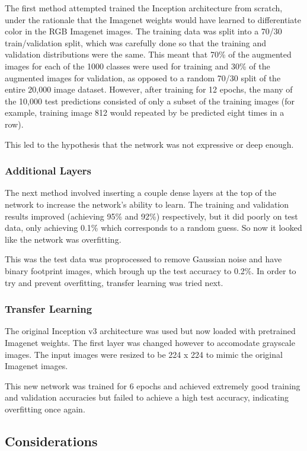 \documentclass{article}
\begin{document}
The first method attempted trained the Inception architecture from scratch, under the rationale that the Imagenet weights would have learned to differentiate color in the RGB Imagenet images. The training data was split into a 70/30 train/validation split, which was carefully done so that the training and validation distributions were the same. This meant that 70\% of the augmented images for each of the 1000 classes were used for training and 30\% of the augmented images for validation, as opposed to a random 70/30 split of the entire 20,000 image dataset. However, after training for 12 epochs, the many of the 10,000 test predictions consisted of only a subset of the training images (for example, training image 812 would repeated by be predicted eight times in a row).

This led to the hypothesis that the network was not expressive or deep enough.

\subsubsection{Additional Layers}

The next method involved inserting a couple dense layers at the top of the network to increase the network's ability to learn. The training and validation results improved (achieving 95\% and 92\%) respectively, but it did poorly on test data, only achieving 0.1\% which corresponds to a random guess. So now it looked like the network was overfitting.

This was the test data was proprocessed to remove Gaussian noise and have binary footprint images, which brough up the test accuracy to 0.2\%. In order to try and prevent overfitting, transfer learning was tried next.

\subsubsection{Transfer Learning}

The original Inception v3 architecture was used but now loaded with pretrained Imagenet weights. The first layer was changed however to accomodate grayscale images. The input images were resized to be 224 x 224 to mimic the original Imagenet images.

This new network was trained for 6 epochs and achieved extremely good training and validation accuracies but failed to achieve a high test accuracy, indicating overfitting once again.

\subsection{Considerations}
\end{document}
